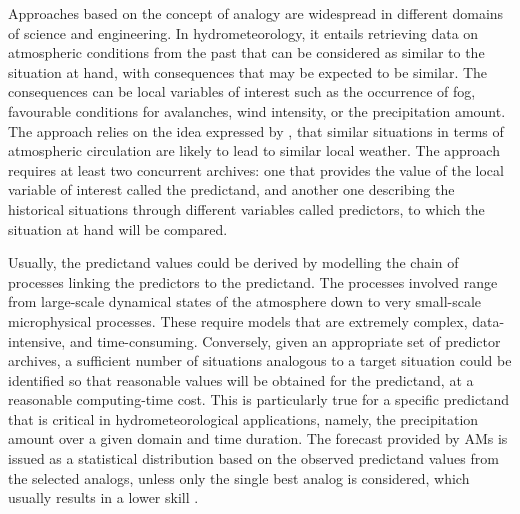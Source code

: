 \documentclass[gmdd]{copernicus}
\begin{document}
\introduction  %

Approaches based on the concept of analogy are widespread in different domains of science and engineering. In hydrometeorology, it entails retrieving data on atmospheric conditions from the past that can be considered as similar to the situation at hand, with consequences that may be expected to be similar. The consequences can be local variables of interest such as the occurrence of fog, favourable conditions for avalanches, wind intensity, or the precipitation amount. The approach relies on the idea expressed by \citet{Lorenz1956, Lorenz1969}, that similar situations in terms of atmospheric circulation are likely to lead to similar local weather. The approach requires at least two concurrent archives: one that provides the value of the local variable of interest called the predictand, and another one describing the historical situations through different variables called predictors, to which the situation at hand will be compared.

Usually, the predictand values could be derived by modelling the chain of processes linking the predictors to the predictand. The processes involved range from large-scale dynamical states of the atmosphere down to very small-scale microphysical processes. These require models that are extremely complex, data-intensive, and time-consuming. Conversely, given an appropriate set of predictor archives, a sufficient number of situations analogous to a target situation could be identified so that reasonable values will be obtained for the predictand, at a reasonable computing-time cost. This is particularly true for a specific predictand that is critical in hydrometeorological applications, namely, the precipitation amount over a given domain and time duration. The forecast provided by AMs is issued as a statistical distribution based on the observed predictand values from the selected analogs, unless only the single best analog is considered, which usually results in a lower skill \citep{Bontron2005}.
\end{document}
